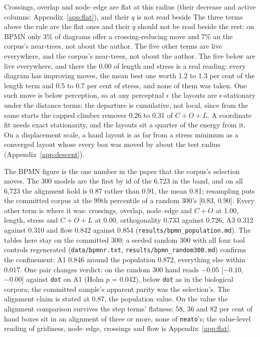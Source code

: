 \documentclass[a4paper,UKenglish]{gd-lipics-v3}
\begin{document}
Crossings, overlap and node--edge are flat at this radius (their decrease and active columns: Appendix~\ref{app:flat}), and their $q$ is not read beside
The three terms above the rule are the flat ones and their $q$ should not be read beside
the rest: on BPMN only 3\% of diagrams offer a crossing-reducing move and 7\% an
the corpus's near-trees, not about the author. The five other terms are live everywhere, and
the corpus's near-trees, not about the author. The five below are live everywhere, and
there the $0.00$ of length and stress is a real reading: every diagram has improving moves,
the mean best one worth 1.2 to 1.3 per cent of the length term and 0.5 to 0.7 per cent of
stress, and none of them was taken. One such move is below perception, so at any
perceptual $\epsilon$ the layouts are $\epsilon$-stationary under the distance terms; the
departure is cumulative, not local, since from the same starts the capped climber removes
0.26 to 0.31 of $C{+}O{+}L$. A coordinate fit needs exact stationarity, and the
layouts sit a quarter of the energy from it. On a displacement scale, a hand layout is
as far from a stress minimum as a converged layout whose every box was moved by about
the test radius (Appendix~\ref{app:descent}).

The BPMN figure is the one number in the paper that the corpus's selection moves. The 300
models are the first by id of the 6{,}723 in the band, and on all 6{,}723 the alignment hold
is 0.87 rather than 0.91, the mean 0.81; resampling puts the committed
corpus at the 99th percentile of a random 300's [0.83, 0.90]. Every other
term is where it was: crossings, overlap, node--edge and $C{+}O$ at 1.00, length, stress and
$C{+}O{+}L$ at 0.00, orthogonality 0.733 against 0.726, A3 0.312 against 0.310 and flow
0.842 against 0.854 (\texttt{results/bpmn\_population.md}). The tables here stay on the
committed 300; a seeded random 300 with all four tool controls regenerated
(\texttt{data/bpmnr.txt}, \texttt{results/bpmn\_random300.md}) confirms the
confinement: A1 0.846 around the population 0.872, everything else within 0.017. One
pair changes verdict: on the random 300 hand reads $-0.05$ [$-0.10$, $-0.00$] against
\texttt{dot} on A1 (Holm $p$ = 0.042), below \texttt{dot} as in the biological
corpora; the committed sample's apparent parity was the selection's. The alignment claim is
stated at 0.87, the population value.
On the value the alignment comparison survives the step terms' flatness: 58, 36 and
82 per cent of hand boxes sit in an alignment of three or more, none of
\texttt{neato}'s; the value-level reading of gridiness, node--edge, crossings and flow
is Appendix~\ref{app:flat}.
\end{document}
